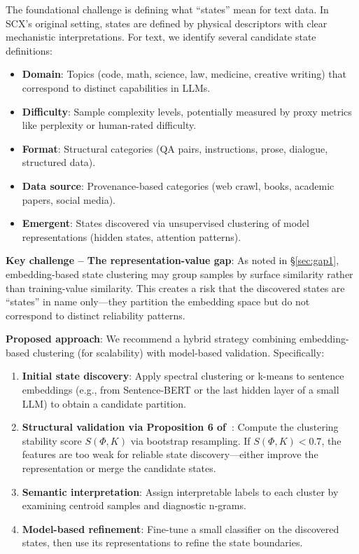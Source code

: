 \documentclass[11pt,twocolumn]{article}
\begin{document}
The foundational challenge is defining what ``states'' mean for text data. In SCX's original setting, states are defined by physical descriptors with clear mechanistic interpretations. For text, we identify several candidate state definitions:

\begin{itemize}
    \item \textbf{Domain}: Topics (code, math, science, law, medicine, creative writing) that correspond to distinct capabilities in LLMs.
    \item \textbf{Difficulty}: Sample complexity levels, potentially measured by proxy metrics like perplexity or human-rated difficulty.
    \item \textbf{Format}: Structural categories (QA pairs, instructions, prose, dialogue, structured data).
    \item \textbf{Data source}: Provenance-based categories (web crawl, books, academic papers, social media).
    \item \textbf{Emergent}: States discovered via unsupervised clustering of model representations (hidden states, attention patterns).
\end{itemize}

\textbf{Key challenge -- The representation-value gap}: As noted in \S\ref{sec:gap1}, embedding-based state clustering may group samples by surface similarity rather than training-value similarity. This creates a risk that the discovered states are ``states'' in name only---they partition the embedding space but do not correspond to distinct reliability patterns.

\textbf{Proposed approach}: We recommend a hybrid strategy combining embedding-based clustering (for scalability) with model-based validation. Specifically:
\begin{enumerate}
    \item \textbf{Initial state discovery}: Apply spectral clustering or k-means to sentence embeddings (e.g., from Sentence-BERT or the last hidden layer of a small LLM) to obtain a candidate partition.
    \item \textbf{Structural validation via Proposition 6 of~\cite{scx2026}}: Compute the clustering stability score $S(\Phi, K)$ via bootstrap resampling. If $S(\Phi, K) < 0.7$, the features are too weak for reliable state discovery---either improve the representation or merge the candidate states.
    \item \textbf{Semantic interpretation}: Assign interpretable labels to each cluster by examining centroid samples and diagnostic n-grams.
    \item \textbf{Model-based refinement}: Fine-tune a small classifier on the discovered states, then use its representations to refine the state boundaries.
\end{enumerate}
\end{document}
